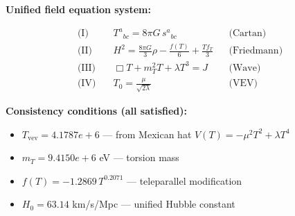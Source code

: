 
\textbf{Unified field equation system:}

\begin{align}
  \text{(I)} \quad & T^a{}_{bc} = 8\pi G \, s^a{}_{bc} && \text{(Cartan)} \\
  \text{(II)} \quad & H^2 = \frac{8\pi G}{3}\rho - \frac{f(T)}{6} + \frac{Tf_T}{3} && \text{(Friedmann)} \\
  \text{(III)} \quad & \Box T + m_T^2 T + \lambda T^3 = J && \text{(Wave)} \\
  \text{(IV)} \quad & T_0 = \frac{\mu}{\sqrt{2\lambda}} && \text{(VEV)}
\end{align}

\textbf{Consistency conditions (all satisfied):}
\begin{itemize}
  \item $T_{\text{vev}} = 4.1787e+6$ — from Mexican hat $V(T) = -\mu^2 T^2 + \lambda T^4$
  \item $m_T = 9.4150e+6$ eV — torsion mass
  \item $f(T) = -1.2869 \, T^{0.2071}$ — teleparallel modification
  \item $H_0 = 63.14$ km/s/Mpc — unified Hubble constant
\end{itemize}